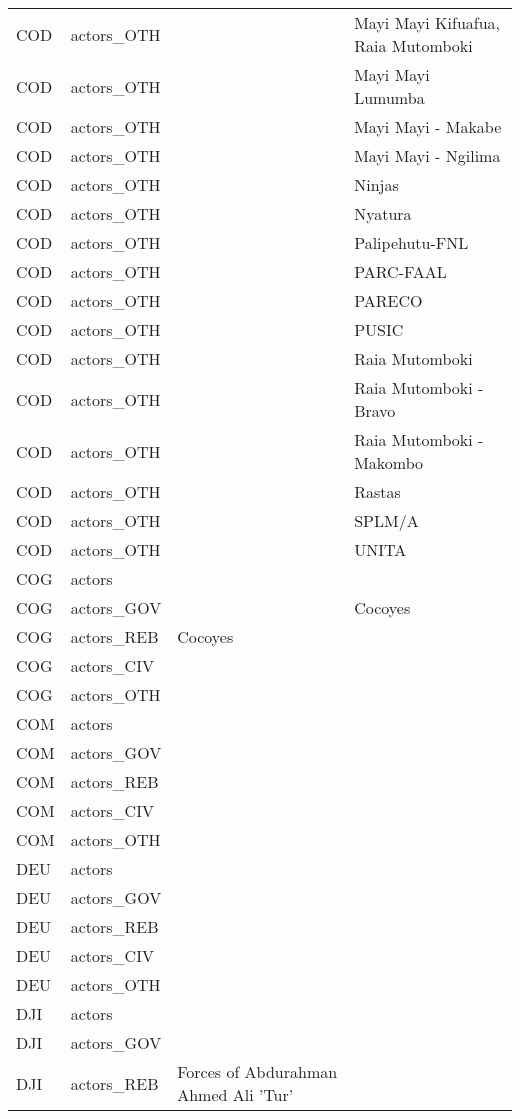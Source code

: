 \begin{table}[ht]
\begin{tabular}{llll}
  COD & actors\_OTH &  & Mayi Mayi Kifuafua, Raia Mutomboki \\ 
  COD & actors\_OTH &  & Mayi Mayi Lumumba \\ 
  COD & actors\_OTH &  & Mayi Mayi - Makabe \\ 
  COD & actors\_OTH &  & Mayi Mayi - Ngilima \\ 
  COD & actors\_OTH &  & Ninjas \\ 
  COD & actors\_OTH &  & Nyatura \\ 
  COD & actors\_OTH &  & Palipehutu-FNL \\ 
  COD & actors\_OTH &  & PARC-FAAL \\ 
  COD & actors\_OTH &  & PARECO \\ 
  COD & actors\_OTH &  & PUSIC \\ 
  COD & actors\_OTH &  & Raia Mutomboki \\ 
  COD & actors\_OTH &  & Raia Mutomboki - Bravo \\ 
  COD & actors\_OTH &  & Raia Mutomboki - Makombo \\ 
  COD & actors\_OTH &  & Rastas \\ 
  COD & actors\_OTH &  & SPLM/A \\ 
  COD & actors\_OTH &  & UNITA \\ 
  COG & actors &  &  \\ 
  COG & actors\_GOV &  & Cocoyes \\ 
  COG & actors\_REB & Cocoyes &  \\ 
  COG & actors\_CIV &  &  \\ 
  COG & actors\_OTH &  &  \\ 
  COM & actors &  &  \\ 
  COM & actors\_GOV &  &  \\ 
  COM & actors\_REB &  &  \\ 
  COM & actors\_CIV &  &  \\ 
  COM & actors\_OTH &  &  \\ 
  DEU & actors &  &  \\ 
  DEU & actors\_GOV &  &  \\ 
  DEU & actors\_REB &  &  \\ 
  DEU & actors\_CIV &  &  \\ 
  DEU & actors\_OTH &  &  \\ 
  DJI & actors &  &  \\ 
  DJI & actors\_GOV &  &  \\ 
  DJI & actors\_REB & Forces of Abdurahman Ahmed Ali 'Tur' &  \\ 

\end{tabular}
\end{table}
